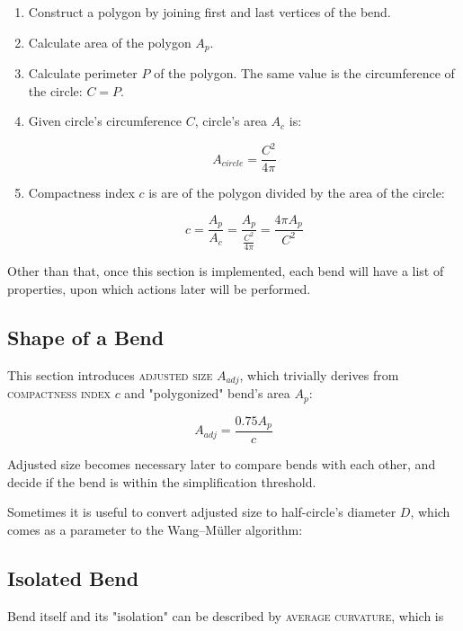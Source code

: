 \documentclass[a4paper]{article}
\newcommand{\WM}{Wang--M{\"u}ller}
\begin{document}
\begin{enumerate}

  \item Construct a polygon by joining first and last vertices of the bend.

  \item Calculate area of the polygon $A_{p}$.

  \item Calculate perimeter $P$ of the polygon. The same value is the
      circumference of the circle: $C = P$.

    \item Given circle's circumference $C$, circle's area $A_{c}$ is:

    \[
      A_{circle} = \frac{C^2}{4\pi}
    \]

  \item Compactness index $c$ is are of the polygon divided by the area of the
    circle:

    \[
      c = \frac{A_{p}}{A_{c}} =
        \frac{A_{p}}{ \frac{C^2}{4\pi} } =
        \frac{4\pi A_{p}}{C^2}
    \]

\end{enumerate}

Other than that, once this section is implemented, each bend will have a list
of properties, upon which actions later will be performed.

\subsection{Shape of a Bend}
\label{sec:shape-of-a-bend}

This section introduces \textsc{adjusted size} $A_{adj}$, which trivially
derives from \textsc{compactness index} $c$ and "polygonized" bend's area $A_{p}$:

\[
  A_{adj} = \frac{0.75 A_{p}}{c}
\]

Adjusted size becomes necessary later to compare bends with each other, and
decide if the bend is within the simplification threshold.

Sometimes it is useful to convert adjusted size to half-circle's diameter $D$,
which comes as a parameter to the {\WM} algorithm:

\subsection{Isolated Bend}

Bend itself and its "isolation" can be described by \textsc{average curvature},
which is 
\end{document}
